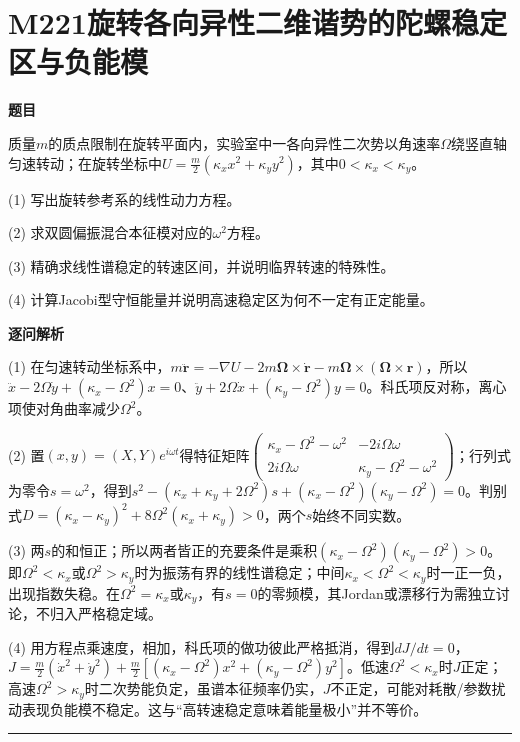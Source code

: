 \documentclass[UTF8,a4paper,11pt,oneside,openany]{ctexbook}
\begin{document}
\section*{M221\quad 旋转各向异性二维谐势的陀螺稳定区与负能模}
\textbf{题目}\par
质量$m$的质点限制在旋转平面内，实验室中一各向异性二次势以角速率$\Omega$绕竖直轴匀速转动；在旋转坐标中$U=\frac m2(\kappa_x x^2+\kappa_y y^2)$，其中$0<\kappa_x<\kappa_y$。
\par\smallskip\noindent (1) 写出旋转参考系的线性动力方程。
\par\smallskip\noindent (2) 求双圆偏振混合本征模对应的$\omega^2$方程。
\par\smallskip\noindent (3) 精确求线性谱稳定的转速区间，并说明临界转速的特殊性。
\par\smallskip\noindent (4) 计算Jacobi型守恒能量并说明高速稳定区为何不一定有正定能量。
\par\medskip\textbf{逐问解析}\par
\par\smallskip\noindent (1) 在匀速转动坐标系中，$m\ddot{\boldsymbol r}=-\nabla U-2m\boldsymbol\Omega\times\dot{\boldsymbol r}-m\boldsymbol\Omega\times(\boldsymbol\Omega\times\boldsymbol r)$，所以$\ddot x-2\Omega\dot y+(\kappa_x-\Omega^2)x=0$、$\ddot y+2\Omega\dot x+(\kappa_y-\Omega^2)y=0$。科氏项反对称，离心项使对角曲率减少$\Omega^2$。
\par\smallskip\noindent (2) 置$(x,y)=(X,Y)e^{i\omega t}$得特征矩阵$\begin{pmatrix}\kappa_x-\Omega^2-\omega^2&-2i\Omega\omega\\2i\Omega\omega&\kappa_y-\Omega^2-\omega^2\end{pmatrix}$；行列式为零令$s=\omega^2$，得到$s^2-(\kappa_x+\kappa_y+2\Omega^2)s+(\kappa_x-\Omega^2)(\kappa_y-\Omega^2)=0$。判别式$D=(\kappa_x-\kappa_y)^2+8\Omega^2(\kappa_x+\kappa_y)>0$，两个$s$始终不同实数。
\par\smallskip\noindent (3) 两$s$的和恒正；所以两者皆正的充要条件是乘积$(\kappa_x-\Omega^2)(\kappa_y-\Omega^2)>0$。即$\Omega^2<\kappa_x$或$\Omega^2>\kappa_y$时为振荡有界的线性谱稳定；中间$\kappa_x<\Omega^2<\kappa_y$时一正一负，出现指数失稳。在$\Omega^2=\kappa_x$或$\kappa_y$，有$s=0$的零频模，其Jordan或漂移行为需独立讨论，不归入严格稳定域。
\par\smallskip\noindent (4) 用方程点乘速度，相加，科氏项的做功彼此严格抵消，得到$dJ/dt=0$，$J=\frac m2(\dot x^2+\dot y^2)+\frac m2[(\kappa_x-\Omega^2)x^2+(\kappa_y-\Omega^2)y^2]$。低速$\Omega^2<\kappa_x$时$J$正定；高速$\Omega^2>\kappa_y$时二次势能负定，虽谱本征频率仍实，$J$不正定，可能对耗散/参数扰动表现负能模不稳定。这与“高转速稳定意味着能量极小”并不等价。
\par\medskip\hrule\medskip
\end{document}
